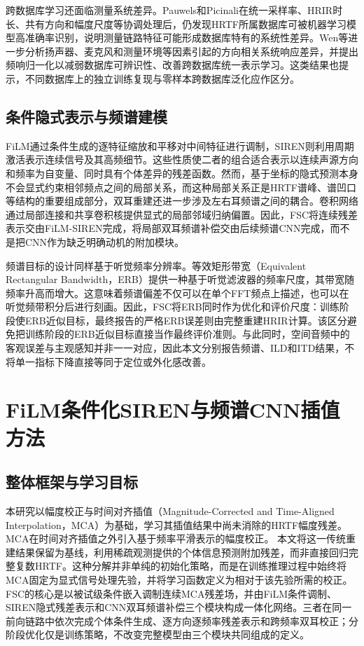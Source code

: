 \documentclass[UTF8,a4paper]{article}
\begin{document}
跨数据库学习还面临测量系统差异。Pauwels和Picinali在统一采样率、HRIR时长、共有方向和幅度尺度等协调处理后，仍发现HRTF所属数据库可被机器学习模型高准确率识别，说明测量链路特征可能形成数据库特有的系统性差异\cite{R24}。Wen等进一步分析扬声器、麦克风和测量环境等因素引起的方向相关系统响应差异，并提出频响归一化以减弱数据库可辨识性、改善跨数据库统一表示学习\cite{R25}。这类结果也提示，不同数据库上的独立训练复现与零样本跨数据库泛化应作区分。

\subsection{条件隐式表示与频谱建模}
FiLM通过条件生成的逐特征缩放和平移对中间特征进行调制\cite{R7}，SIREN则利用周期激活表示连续信号及其高频细节\cite{R11}。这些性质使二者的组合适合表示以连续声源方向和频率为自变量、同时具有个体差异的残差函数。然而，基于坐标的隐式预测本身不会显式约束相邻频点之间的局部关系，而这种局部关系正是HRTF谱峰、谱凹口等结构的重要组成部分，双耳重建还进一步涉及左右耳频谱之间的耦合。卷积网络通过局部连接和共享卷积核提供显式的局部邻域归纳偏置\cite{R21}。因此，FSC将连续残差表示交由FiLM-SIREN完成，将局部双耳频谱补偿交由后续频谱CNN完成，而不是把CNN作为缺乏明确动机的附加模块。

频谱目标的设计同样基于听觉频率分辨率。等效矩形带宽（Equivalent Rectangular Bandwidth，ERB）提供一种基于听觉滤波器的频率尺度，其带宽随频率升高而增大\cite{R23}。这意味着频谱偏差不仅可以在单个FFT频点上描述，也可以在听觉频带积分后进行刻画。因此，FSC将ERB同时作为优化和评价尺度：训练阶段使ERB近似目标，最终报告的严格ERB误差则由完整重建HRIR计算。该区分避免把训练阶段的ERB近似目标直接当作最终评价准则。与此同时，空间音频中的客观误差与主观感知并非一一对应\cite{R18}，因此本文分别报告频谱、ILD和ITD结果，不将单一指标下降直接等同于定位或外化感改善。

\section{FiLM条件化SIREN与频谱CNN插值方法}
\label{sec:method}

\subsection{整体框架与学习目标}
本研究以幅度校正与时间对齐插值（Magnitude-Corrected and Time-Aligned Interpolation，MCA）为基础，学习其插值结果中尚未消除的HRTF幅度残差。MCA在时间对齐插值之外引入基于频率平滑表示的幅度校正\cite{R1}。
本文将这一传统重建结果保留为基线，利用稀疏观测提供的个体信息预测附加残差，而非直接回归完整复数HRTF。这种分解并非单纯的初始化策略，而是在训练推理过程中始终将MCA固定为显式信号处理先验，并将学习函数定义为相对于该先验所需的校正。FSC的核心是以被试级条件嵌入调制连续MCA残差场，并由FiLM条件调制、SIREN隐式残差表示和CNN双耳频谱补偿三个模块构成一体化网络。三者在同一前向链路中依次完成个体条件生成、逐方向逐频率残差表示和跨频率双耳校正；分阶段优化仅是训练策略，不改变完整模型由三个模块共同组成的定义。
\end{document}
